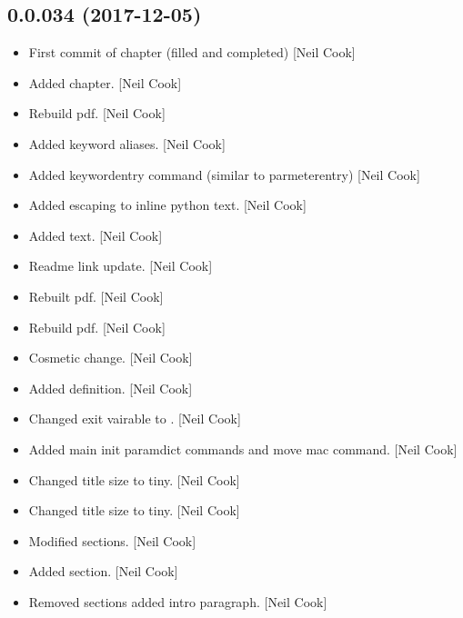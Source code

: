 \documentclass[a4paper,10pt,english]{report}
\begin{document}
\subsection{0.0.034 (2017-12-05)}
\label{\detokenize{misc/changelog:id517}}\begin{itemize}
\item {} 
First commit of  chapter (filled and completed) {[}Neil
Cook{]}

\item {} 
Added  chapter. {[}Neil Cook{]}

\item {} 
Rebuild pdf. {[}Neil Cook{]}

\item {} 
Added keyword aliases. {[}Neil Cook{]}

\item {} 
Added keywordentry command (similar to parmeterentry) {[}Neil Cook{]}

\item {} 
Added escaping to inline python text. {[}Neil Cook{]}

\item {} 
Added text. {[}Neil Cook{]}

\item {} 
Readme link update. {[}Neil Cook{]}

\item {} 
Rebuilt pdf. {[}Neil Cook{]}

\item {} 
Rebuild pdf. {[}Neil Cook{]}

\item {} 
Cosmetic change. {[}Neil Cook{]}

\item {} 
Added  definition. {[}Neil Cook{]}

\item {} 
Changed exit vairable to . {[}Neil Cook{]}

\item {} 
Added main init paramdict commands and move mac command. {[}Neil Cook{]}

\item {} 
Changed title size to tiny. {[}Neil Cook{]}

\item {} 
Changed title size to tiny. {[}Neil Cook{]}

\item {} 
Modified sections. {[}Neil Cook{]}

\item {} 
Added section. {[}Neil Cook{]}

\item {} 
Removed sections added intro paragraph. {[}Neil Cook{]}

\end{itemize}
\end{document}

